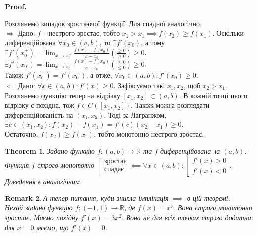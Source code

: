 \documentclass[a4paper, 14pt]{article}
\makeatletter
\def\qed{$\blacksquare$}
\def\rightproof{$\boxed{\Rightarrow}$ }
\def\leftproof{$\boxed{\Leftarrow}$ }
\theoremstyle{theoremdd}
\newtheorem{theorem}{Theorem}[subsection]
\theoremstyle{theoremdd}
\theoremstyle{theoremdd}
\theoremstyle{theoremdd}
\theoremstyle{theoremdd}
\theoremstyle{theoremdd}
\newtheorem{remark}[theorem]{Remark}
\theoremstyle{theoremdd}
\theoremstyle{theoremdd}
\renewenvironment{proof}[1][Proof.\\]{\par
\pushQED{\hfill \qed}%
\normalfont \topsep6\p@\@plus6\p@\relax
\trivlist
\item\relax
{\bfseries
#1\@addpunct{.}}\hspace\labelsep\ignorespaces
}{%
\popQED\endtrivlist\@endpefalse
}
\makeatother
\begin{document}
\begin{proof}
Розглянемо випадок зростаючої функції. Для спадної аналогічно.\\
\rightproof Дано: $f$ -- нестрого зростає, тобто $x_2 > x_1 \implies f(x_2) \geq f(x_1)$. Оскільки диференційована $\forall x_0 \in (a,b)$, то $\exists f'(x_0)$, а тому \\ 
$\exists f'(x_0^+) = \displaystyle \lim_{x \to x_0^+} \frac{f(x)-f(x_0)}{x-x_0} \left( \frac{\geq 0}{\geq 0} \right) \geq 0$.\\
$\exists f'(x_0^-) = \displaystyle \lim_{x \to x_0^-} \frac{f(x)-f(x_0)}{x-x_0} \left( \frac{\leq 0}{\leq 0} \right) \geq 0$.\\
Також $f'(x_0^+) = f'(x_0^-)$, а отже, $\forall x_0 \in (a,b): f'(x_0) \geq 0$.
\bigskip \\
\leftproof Дано: $\forall x \in (a,b): f'(x) \geq 0$. Зафіксуємо такі $x_1,x_2$, щоб $x_2 > x_1$. Розглянемо функцію тепер на відрізку $[x_1,x_2] \subset (a,b)$. В кожній точці цього відрізку є похідна, тож $f \in C([x_1,x_2])$. Також можна розглядати диференційованість на $(x_1,x_2)$. Тоді за Лагранжом,\\
$\exists c \in (x_1,x_2): f(x_2)-f(x_1) = f'(c)(x_2-x_1) \geq 0$.\\
Остаточно, $f(x_2) \geq f(x_1)$, тобто монотонно нестрого зростає.
\end{proof}

\begin{theorem}
Задано функцію $f \colon (a,b) \to \mathbb{R}$ та $f$ диференційована на $(a,b)$.\\
Функція $f$ строго монотонно $\left[ \begin{gathered} \textrm{зростає} \\ \textrm{спадає} \end{gathered} \right. \impliedby \forall x \in (a,b): \left[ \begin{gathered} f'(x) > 0 \\ f'(x) < 0 \end{gathered} \right.$.\\
\textit{Доведення є аналогічним.}
\end{theorem}

\begin{remark}
А тепер питання, куди зникла імплікація $\implies$ в цій теоремі.\\
Нехай задано функцію $f \colon (-1,1) \to \mathbb{R}$, де $f(x) = x^3$. Вона строго монотонно зростає. Маємо похідну $f'(x) = 3x^2$. Вона не для всіх точках строго додатна: для $x = 0$ маємо, що $f'(x) = 0$.
\end{remark}
\end{document}
